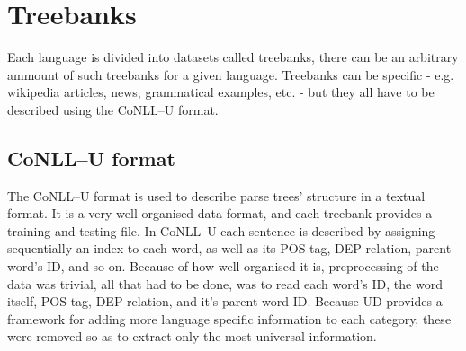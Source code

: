 \section{Treebanks}
Each language is divided into datasets called treebanks, there can be an arbitrary ammount of such treebanks for a given language. Treebanks can be specific - e.g. wikipedia articles, news, grammatical examples, etc. - but they all have to be described using the CoNLL--U format.
\subsection{CoNLL--U format}
The CoNLL--U format is used to describe parse trees' structure in a textual format. It is a very well organised data format, and each treebank provides a training and testing file. In CoNLL--U each sentence is described by assigning sequentially an index to each word, as well as its POS tag, DEP relation, parent word's ID, and so on. 
Because of how well organised it is, preprocessing of the data was trivial,
all that had to be done, was to read each word's ID, the word itself, POS tag, DEP relation, and it's parent word ID.
Because UD provides a framework for adding more language specific information to each category, these were removed so as to extract only the most universal information.



